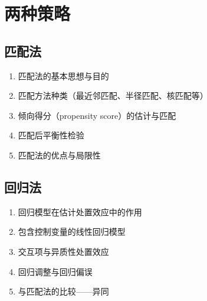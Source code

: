 \section{两种策略}

\subsection{匹配法}
\begin{enumerate}
	\item 匹配法的基本思想与目的
	\item 匹配方法种类（最近邻匹配、半径匹配、核匹配等）
	\item 倾向得分（propensity score）的估计与匹配
	\item 匹配后平衡性检验
	\item 匹配法的优点与局限性
\end{enumerate}

\subsection{回归法}
\begin{enumerate}
	\item 回归模型在估计处置效应中的作用
	\item 包含控制变量的线性回归模型
	\item 交互项与异质性处置效应
	\item 回归调整与回归偏误
	\item 与匹配法的比较——异同
\end{enumerate}